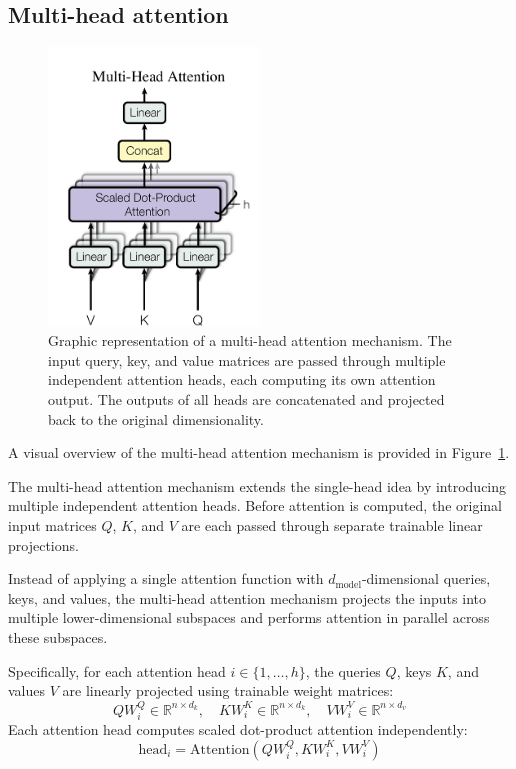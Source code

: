 \documentclass{pracalicmgr}
\begin{document}
\subsection{Multi-head attention}

\begin{figure}[h]
    \centering
    \includegraphics[width=0.5\textwidth]{src/multiHead.png}
    \caption{Graphic representation of a multi-head attention mechanism. The input query, key, and value matrices are passed through multiple independent attention heads, each computing its own attention output. The outputs of all heads are concatenated and projected back to the original dimensionality.}
    \label{fig:multiHeadAttention}
\end{figure}

A visual overview of the multi-head attention mechanism is provided in Figure~\ref{fig:multiHeadAttention}.

The multi-head attention mechanism extends the single-head idea by introducing multiple independent attention heads. Before attention is computed, the original input matrices \( Q \), \( K \), and \( V \) are each passed through separate trainable linear projections.

Instead of applying a single attention function with \( d_{\text{model}} \)-dimensional queries, keys, and values, the multi-head attention mechanism projects the inputs into multiple lower-dimensional subspaces and performs attention in parallel across these subspaces.

Specifically, for each attention head \( i \in \{1, \dots, h\} \), the queries \( Q \), keys \( K \), and values \( V \) are linearly projected using trainable weight matrices:
\[
QW_i^Q \in \mathbb{R}^{n \times d_k}, \quad KW_i^K \in \mathbb{R}^{n \times d_k}, \quad VW_i^V \in \mathbb{R}^{n \times d_v}
\]
Each attention head computes scaled dot-product attention independently:
\[
\text{head}_i = \text{Attention}(QW_i^Q, KW_i^K, VW_i^V)
\]
\end{document}
